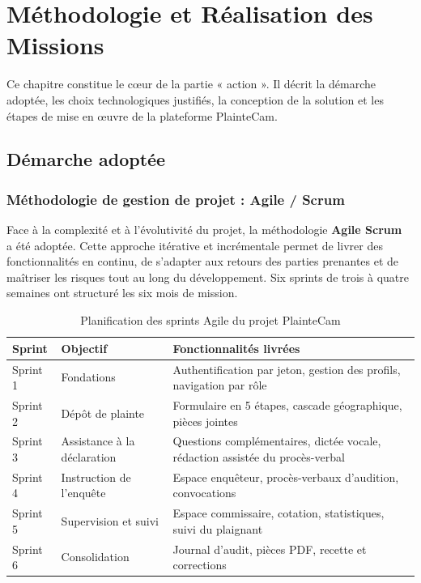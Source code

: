 
\chapter{Méthodologie et Réalisation des Missions}
\label{ch:realisation}

Ce chapitre constitue le cœur de la partie « action ». Il décrit la démarche adoptée, les choix technologiques justifiés, la conception de la solution et les étapes de mise en œuvre de la plateforme PlainteCam.

\section{Démarche adoptée}

\subsection{Méthodologie de gestion de projet : Agile / Scrum}

Face à la complexité et à l'évolutivité du projet, la méthodologie \textbf{Agile Scrum}~\cite{agile:manifesto} a été adoptée. Cette approche itérative et incrémentale permet de livrer des fonctionnalités en continu, de s'adapter aux retours des parties prenantes et de maîtriser les risques tout au long du développement. Six sprints de trois à quatre semaines ont structuré les six mois de mission.

\begin{table}[H]
    \centering
    \begin{tabularx}{\textwidth}{|l|>{\raggedright\arraybackslash}X|>{\raggedright\arraybackslash}X|}
        \hline
        \textbf{Sprint} & \textbf{Objectif} & \textbf{Fonctionnalités livrées} \\
        \hline
        Sprint 1 & Fondations & Authentification par jeton, gestion des profils, navigation par rôle \\
        \hline
        Sprint 2 & Dépôt de plainte & Formulaire en 5 étapes, cascade géographique, pièces jointes \\
        \hline
        Sprint 3 & Assistance à la déclaration & Questions complémentaires, dictée vocale, rédaction assistée du procès-verbal \\
        \hline
        Sprint 4 & Instruction de l'enquête & Espace enquêteur, procès-verbaux d'audition, convocations \\
        \hline
        Sprint 5 & Supervision et suivi & Espace commissaire, cotation, statistiques, suivi du plaignant \\
        \hline
        Sprint 6 & Consolidation & Journal d'audit, pièces PDF, recette et corrections \\
        \hline
    \end{tabularx}
    \caption{Planification des sprints Agile du projet PlainteCam}
    \label{tab:sprints}
\end{table}

